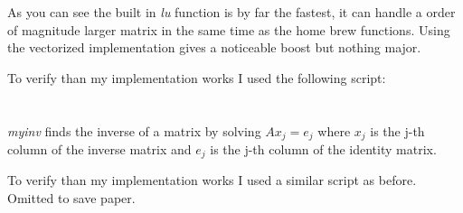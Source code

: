 \documentclass[12pt]{article}
\begin{document}
As you can see the built in \textit{lu} function is by far the fastest, it can handle a order of magnitude larger matrix in the same time as the home brew functions. Using the vectorized implementation gives a noticeable boost but nothing major.

\begin{minipage}{\linewidth}

\end{minipage}

To verify than my implementation works I used the following script:

\begin{minipage}{\linewidth}

\end{minipage}


\section{} %

\textit{myinv} finds the inverse of a matrix by solving $Ax_j = e_j$ where $x_j$ is the j-th column of the inverse matrix and $e_j$ is the j-th column of the identity matrix.

\begin{minipage}{\linewidth}

\end{minipage}

To verify than my implementation works I used a similar script as before. Omitted to save paper.
\end{document}

